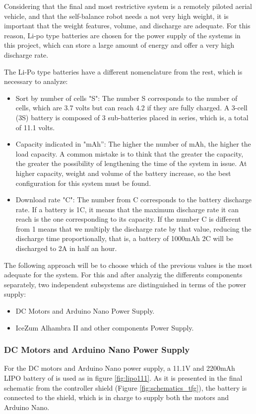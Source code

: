 Considering that the final and most restrictive system is a remotely piloted aerial vehicle, and that the self-balance robot needs a not very high weight, it is important that the weight features, volume, and discharge are adequate. For this reason, Li-po type batteries are chosen for the power supply of the systems in this project, which can store a large amount of energy and offer a very high discharge rate. \newline

The Li-Po type batteries have a different nomenclature from the rest, which is necessary to analyze:

\begin{itemize}
	\item Sort by number of cells "S": The number S corresponds to the number of cells, which are 3.7 volts but can reach 4.2 if they are fully charged. A 3-cell (3S) battery is composed of 3 sub-batteries placed in series, which is, a total of 11.1 volts.
	\item Capacity indicated in "mAh”: The higher the number of mAh, the higher the load capacity. A common mistake is to think that the greater the capacity, the greater the possibility of lengthening the time of the system in issue. At higher capacity, weight and volume of the battery increase, so the best configuration for this system must be found.
	\item Download rate "C": The number from C corresponds to the battery discharge rate. If a battery is 1C, it means that the maximum discharge rate it can reach is the one corresponding to its capacity. If the number C is different from 1 means that we multiply the discharge rate by that value, reducing the discharge time proportionally, that is, a battery of 1000mAh 2C will be discharged to 2A in half an hour.
\end{itemize}

The following approach will be to choose which of the previous values is the most adequate for the system. For this and after analyzig the differents components separately, two independent subsystems are distinguished in terms of the power supply:

\begin{itemize}
	\item DC Motors and Arduino Nano Power Supply.
	\item IceZum Alhambra II and other components Power Supply.
\end{itemize}

\subsubsection{DC Motors and Arduino Nano Power Supply}
For the DC motors and Arduino Nano power supply, a 11.1V and 2200mAh LIPO battery of is used as in figure \ref{fig:lipo111}. As it is presented in the final schematic from the controller
shield (Figure \ref{fig:schematics_tfg}), the battery is connected to the shield, which is in charge to supply both the motors and Arduino Nano.

